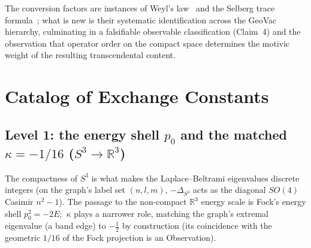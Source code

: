 \documentclass[aps,pra,twocolumn,superscriptaddress,longbibliography]{revtex4-2}
\begin{document}
The conversion factors are instances of Weyl's law~\cite{weyl1911} and
the Selberg trace formula~\cite{selberg1956}; what is new is their
systematic identification across the GeoVac hierarchy, culminating in a
falsifiable observable classification (Claim~4) and the observation that
operator order on the compact space determines the motivic weight of the
resulting transcendental content.



\section{Catalog of Exchange Constants}
\label{sec:catalog}

\subsection{Level 1: the energy shell $p_0$ and the matched $\kappa = -1/16$ ($S^3 \to \mathbb{R}^3$)}
\label{sec:kappa}

The compactness of $S^3$ is what makes the Laplace--Beltrami
eigenvalues discrete integers (on the graph's label set $(n,l,m)$,
$-\Delta_{S^3}$ acts as the diagonal $SO(4)$ Casimir $n^2-1$).  The
passage to the non-compact $\mathbb{R}^3$ energy scale is Fock's
energy shell $p_0^2 = -2E$;\ $\kappa$ plays a narrower role, matching
the graph's extremal eigenvalue (a band edge) to $-\tfrac12$ by
construction (its coincidence with the geometric $1/16$ of the Fock
projection is an Observation).
\end{document}
